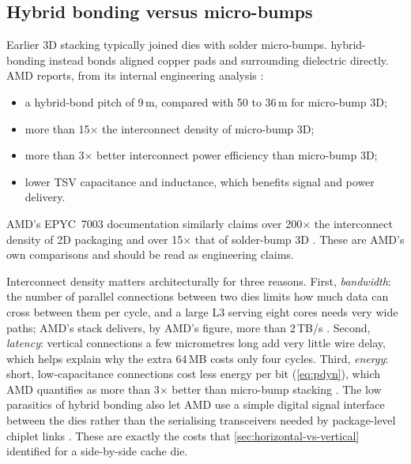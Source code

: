 

\subsection{Hybrid bonding versus micro-bumps}
Earlier 3D stacking typically joined dies with solder \glspl{micro-bump}. \Gls{hybrid-bonding} instead bonds aligned copper pads and surrounding dielectric directly. AMD reports, from its internal engineering analysis \cite{swaminathanAdvancedPackagingEnabling2021}:
\begin{itemize}
  \item a hybrid-bond pitch of 9\,\textmu m, compared with 50 to 36\,\textmu m for micro-bump 3D;
  \item more than 15$\times$ the interconnect density of micro-bump 3D;
  \item more than 3$\times$ better interconnect power efficiency than micro-bump 3D;
  \item lower TSV capacitance and inductance, which benefits signal and power delivery.
\end{itemize}
AMD's EPYC~7003 documentation similarly claims over 200$\times$ the interconnect density of 2D packaging and over 15$\times$ that of solder-bump 3D \cite{amd2022epyc7003}. These are AMD's own comparisons and should be read as engineering claims.

Interconnect density matters architecturally for three reasons. First, \emph{bandwidth}: the number of parallel connections between two dies limits how much data can cross between them per cycle, and a large L3 serving eight cores needs very wide paths; AMD's stack delivers, by AMD's figure, more than 2\,TB/s \cite[slide~20]{wuu2022vcache}. Second, \emph{latency}: vertical connections a few micrometres long add very little wire delay, which helps explain why the extra 64\,MB costs only four cycles. Third, \emph{energy}: short, low-capacitance connections cost less energy per bit (\cref{eq:pdyn}), which AMD quantifies as more than 3$\times$ better than micro-bump stacking \cite[slide~15]{wuu2022vcache}. The low parasitics of hybrid bonding also let AMD use a simple digital signal interface between the dies rather than the serialising transceivers needed by package-level chiplet links \cite[slide~26]{wuu2022vcache}. These are exactly the costs that \cref{sec:horizontal-vs-vertical} identified for a side-by-side cache die.

